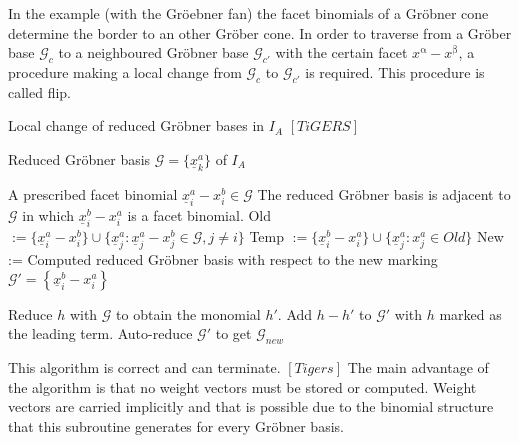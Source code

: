 In the example (with the Gröebner fan) the facet binomials of a Gröbner cone determine the border to an other Gröber cone.
In order to traverse from a Gröber base $\mathcal{G}_c$ to a neighboured Gröbner base $\mathcal{G}_{c'}$ with the certain facet $x^{\upalpha}-x^{\upbeta} $, a procedure making a local change from $\mathcal{G}_c$ to $\mathcal{G}_{c'}$ is required.
This procedure is called flip.

\newpage



\begin{algorithm}
\caption{Local change of reduced Gröbner bases in $I_A$ $\left[ TiGERS\right]  $}
\label{flip-alg}
\begin{algorithmic}[1]

\Require
Reduced Gröbner basis $ \mathcal{G} = \lbrace \underline{x}^{a}_{k}  \rbrace $ of $I_A$

A prescribed facet binomial $ \underline{x}^{a}_{i} - x^{b}_{i} \in \mathcal{G} $
\Ensure The reduced Gröbner basis is adjacent to $\mathcal{G}$ in which $ \underline{x}^{b}_{i} - x^{a}_{i} $ is a facet binomial.
\State Old 
$:= \lbrace \underline{x}^{a}_{i} - x^{b}_{i} \rbrace \cup
 \lbrace \underline{x}^{a}_{j} : \underline{x}^{a}_{j} - x^{b}_{j} \in \mathcal{G},
 j \neq i \rbrace $ 
 \State Temp $:= \lbrace \underline{x}^{b}_{i} - x^{a}_{i} \rbrace \cup 
 \lbrace \underline{x}^{a}_{j} : x^{a}_{j} \in Old  \rbrace $
 \State New := Computed reduced Gröbner basis with respect to the new marking 
 \State $\mathcal{G}' = \left\lbrace \underline{x}^{b}_{i} - x^{a}_{i} \right\rbrace  $
 
 \State Reduce $h$ with $\mathcal{G}$ to obtain the monomial $h'$.
 \State Add $h-h'$ to $\mathcal{G}'$ with $h$ marked as the leading term.
 \EndFor
 \State Auto-reduce $\mathcal{G}'$ to get $\mathcal{G}_{new}$

\end{algorithmic}
\end{algorithm}

This algorithm is correct and can terminate. $ \left[ Tigers \right] $
The main advantage of the algorithm is that no weight vectors must be stored or computed.
Weight vectors are carried implicitly and that is possible due to the binomial structure that this subroutine generates for every Gröbner basis.

